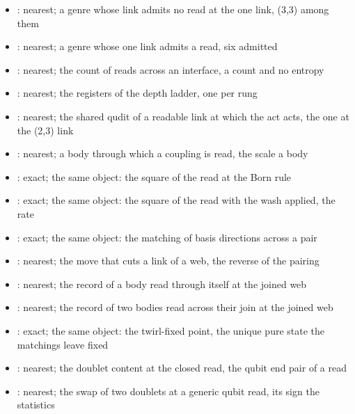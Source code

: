 \begin{chtheorem}
\begin{itemize}
\item {}: nearest; a genre whose link admits no read at the one link, (3,3) among them
\item {}: nearest; a genre whose one link admits a read, six admitted
\item {}: nearest; the count of reads across an interface, a count and no entropy
\item {}: nearest; the registers of the depth ladder, one per rung
\item {}: nearest; the shared qudit of a readable link at which the act acts, the one at the (2,3) link
\item {}: nearest; a body through which a coupling is read, the scale a body
\item {}: exact; the same object: the square of the read at the Born rule
\item {}: exact; the same object: the square of the read with the wash applied, the rate
\item {}: exact; the same object: the matching of basis directions across a pair
\item {}: nearest; the move that cuts a link of a web, the reverse of the pairing
\item {}: nearest; the record of a body read through itself at the joined web
\item {}: nearest; the record of two bodies read across their join at the joined web
\item {}: exact; the same object: the twirl-fixed point, the unique pure state the matchings leave fixed
\item {}: nearest; the doublet content at the closed read, the qubit end pair of a read
\item {}: nearest; the swap of two doublets at a generic qubit read, its sign the statistics

\end{itemize}
\end{chtheorem}
